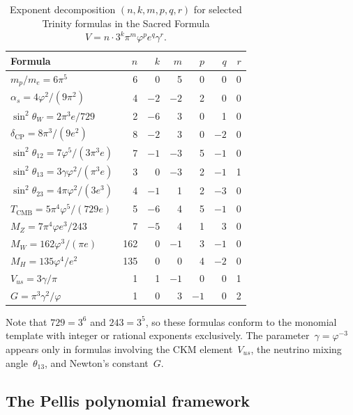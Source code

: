 \documentclass[11pt,a4paper]{article}
\newcommand{\vp}{\varphi}
\begin{document}
\begin{table}[H]
\centering
\caption{Exponent decomposition $(n,k,m,p,q,r)$ for selected Trinity
  formulas in the Sacred Formula
  $V = n\cdot 3^{k}\pi^{m}\vp^{p}e^{q}\gamma^{r}$.}
\label{tab:exponents}
\begin{tabular}{lrrrrrr}
\toprule
Formula & $n$ & $k$ & $m$ & $p$ & $q$ & $r$ \\
\midrule
$m_p/m_e = 6\pi^{5}$                         &  6 &  0 &  5 &  0 &  0 & 0 \\
$\alpha_s = 4\vp^{2}/(9\pi^{2})$             &  4 & $-2$ & $-2$ &  2 &  0 & 0 \\
$\sin^{2}\!\theta_W = 2\pi^{3}e/729$         &  2 & $-6$ &  3 &  0 &  1 & 0 \\
$\delta_{\mathrm{CP}} = 8\pi^{3}/(9e^{2})$   &  8 & $-2$ &  3 &  0 & $-2$ & 0 \\
$\sin^{2}\!\theta_{12} = 7\vp^{5}/(3\pi^{3}e)$ &  7 & $-1$ & $-3$ &  5 & $-1$ & 0 \\
$\sin^{2}\!\theta_{13} = 3\gamma\vp^{2}/(\pi^{3}e)$ &  3 &  0 & $-3$ &  2 & $-1$ & 1 \\
$\sin^{2}\!\theta_{23} = 4\pi\vp^{2}/(3e^{3})$ &  4 & $-1$ &  1 &  2 & $-3$ & 0 \\
$T_{\mathrm{CMB}} = 5\pi^{4}\vp^{5}/(729e)$  &  5 & $-6$ &  4 &  5 & $-1$ & 0 \\
$M_Z = 7\pi^{4}\vp e^{3}/243$                &  7 & $-5$ &  4 &  1 &  3 & 0 \\
$M_W = 162\vp^{3}/(\pi e)$                   & 162 &  0 & $-1$ &  3 & $-1$ & 0 \\
$M_H = 135\vp^{4}/e^{2}$                     & 135 &  0 &  0 &  4 & $-2$ & 0 \\
$V_{us} = 3\gamma/\pi$                       &  1 &  1 & $-1$ &  0 &  0 & 1 \\
$G = \pi^{3}\gamma^{2}/\vp$                  &  1 &  0 &  3 & $-1$ &  0 & 2 \\
\bottomrule
\end{tabular}
\end{table}

\noindent Note that $729 = 3^{6}$ and $243 = 3^{5}$, so these formulas conform to the
monomial template with integer or rational exponents exclusively. The parameter~$\gamma=\vp^{-3}$ appears only in formulas involving the CKM element~$V_{us}$, the neutrino mixing angle~$\theta_{13}$, and Newton's constant~$G$.

\subsection{The Pellis polynomial framework}\label{sec:pellis}
\end{document}
